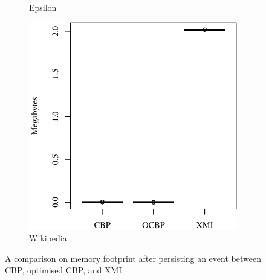 \documentclass{llncs}
\begin{document}
\begin{figure}
\begin{subfigure}{0.325\textwidth}
            \caption{Epsilon}
            \label{fig:save_memory_epsilon}
        \end{subfigure}
        \hfill
        \begin{subfigure}{0.325\textwidth}
            \centering
            \includegraphics[width=\linewidth]{images/save_memory_wikipedia}
            \caption{Wikipedia}
            \label{fig:save_memory_wikipedia}
        \end{subfigure}
        \caption{A comparison on memory footprint after persisting an event between CBP, optimised CBP, and XMI.}
        \label{fig:savememory}
    \end{figure}
\end{document}
